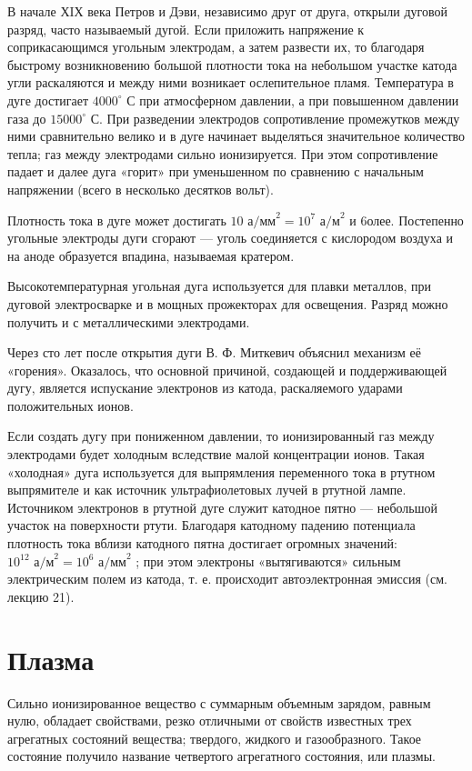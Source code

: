 \documentclass[a4paper,10pt]{book}
\begin{document}
В начале ХIХ века Петров и Дэви, независимо друг от друга, открыли дуговой разряд, часто называемый дугой. Если приложить напряжение к соприкасающимся угольным электродам, а затем развести их, то благодаря быстрому возникновению большой плотности тока на небольшом участке катода угли раскаляются и между ними возникает ослепительное пламя. Температура в дуге достигает $4000^{\circ}$ С при атмосферном давлении, а при повышенном давлении газа до $15 000^{\circ}$ С. При разведении электродов сопротивление промежутков между ними сравнительно велико и в дуге начинает выделяться значительное количество тепла; газ между электродами сильно ионизируется. При этом сопротивление падает и далее дуга «горит» при уменьшенном по сравнению с начальным напряжении (всего в несколько десятков вольт).

Плотность тока в дуге может достигать $10\textit{ а/мм}^2 = 10^7\textit{ а/м}^2$ и 6олее. Постепенно угольные электроды дуги сгорают — уголь соединяется с кислородом воздуха и на аноде образуется впадина, называемая кратером.

Высокотемпературная угольная дуга используется для плавки металлов, при дуговой электросварке и в мощных прожекторах для освещения. Разряд можно получить и с металлическими электродами.

Через сто лет после открытия дуги В. Ф. Миткевич объяснил механизм её «горения». Оказалось, что основной причиной, создающей и поддерживающей дугу, является испускание электронов из катода, раскаляемого ударами положительных ионов.

Если создать дугу при пониженном давлении, то ионизированный газ между электродами будет холодным вследствие малой концентрации ионов. Такая «холодная» дуга используется для выпрямления переменного тока в ртутном выпрямителе и как источник ультрафиолетовых лучей в ртутной лампе. Источником электронов в ртутной дуге служит катодное пятно — небольшой участок на поверхности ртути. Благодаря катодному падению потенциала плотность тока вблизи катодного пятна достигает огромных значений: $10^{12}\textit{ а/м}^2 = 10^6\textit{ а/мм}^2$ ; при этом электроны «вытягиваются» сильным электрическим полем из катода, т. е. происходит автоэлектронная эмиссия (см. лекцию 21).

\section{Плазма}

Сильно ионизированное вещество с суммарным объемным зарядом, равным нулю, обладает свойствами, резко отличными от свойств известных трех агрегатных состояний вещества; твердого, жидкого и газообразного. Такое состояние получило название четвертого агрегатного состояния, или плазмы.
\end{document}

